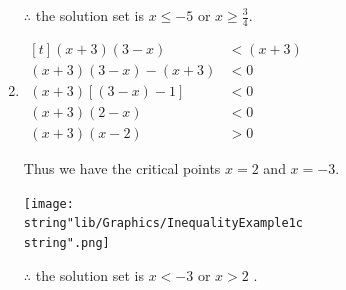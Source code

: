 \documentclass[11pt,a4paper]{book}
\begin{document}
\begin{example}{}
\begin{enumerate}[label=(\alph*)]
$\therefore$ the solution set is ${\displaystyle x\leq-5}$ or ${\displaystyle x\geq\frac{3}{4}}$.

\item
$
\begin{aligned}[t]
\left(x+3\right)\left(3-x\right) & <\left(x+3\right)\\
\left(x+3\right)\left(3-x\right)-\left(x+3\right) & <0\\
\left(x+3\right)\left[\left(3-x\right)-1\right] & <0\\
\left(x+3\right)\left(2-x\right) & <0\\
\left(x+3\right)\left(x-2\right) & >0
\end{aligned}
$

Thus we have the critical points $x=2$ and $x=-3$.
\begin{center}
\texttt{[image: \\string"lib/Graphics/InequalityExample1c\\string".png]}
\par\end{center}

$\therefore$ the solution set is $x<-3$ or $x>2$ .

\end{enumerate}
\end{example}
\end{document}
